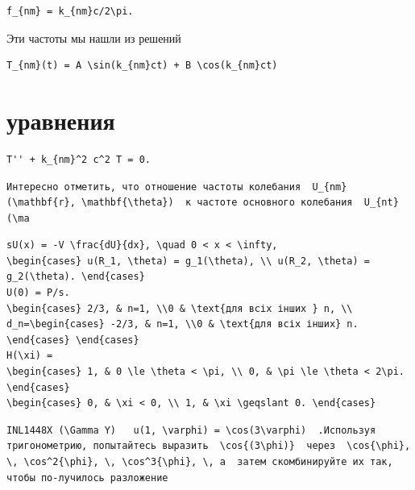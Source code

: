 \documentclass[
  ukrainian,
]{article}
\begin{document}
\begin{verbatim}
f_{nm} = k_{nm}c/2\pi.
\end{verbatim}

Эти частоты мы нашли из решений

\begin{verbatim}
T_{nm}(t) = A \sin(k_{nm}ct) + B \cos(k_{nm}ct)
\end{verbatim}

\section{уравнения}\label{ux443ux440ux430ux432ux43dux435ux43dux438ux44f}

\begin{verbatim}
T'' + k_{nm}^2 c^2 T = 0.
\end{verbatim}

\begin{verbatim}
Интересно отметить, что отношение частоты колебания  U_{nm}(\mathbf{r}, \mathbf{\theta})  к частоте основного колебания  U_{nt}(\ma
\end{verbatim}

\begin{verbatim}
sU(x) = -V \frac{dU}{dx}, \quad 0 < x < \infty,
\begin{cases} u(R_1, \theta) = g_1(\theta), \\ u(R_2, \theta) = g_2(\theta). \end{cases}
U(0) = P/s.
\begin{cases} 2/3, & n=1, \\0 & \text{для всіх інших } n, \\ d_n=\begin{cases} -2/3, & n=1, \\0 & \text{для всіх інших} n. \end{cases} \end{cases}
H(\xi) =
\begin{cases} 1, & 0 \le \theta < \pi, \\ 0, & \pi \le \theta < 2\pi. \end{cases}
\begin{cases} 0, & \xi < 0, \\ 1, & \xi \geqslant 0. \end{cases}
\end{verbatim}

\begin{verbatim}
INL1448X (\Gamma Y)   u(1, \varphi) = \cos(3\varphi)  .Используя тригонометрию, попытайтесь выразить  \cos{(3\phi)}  через  \cos{\phi}, \, \cos^2{\phi}, \, \cos^3{\phi}, \, a  затем скомбинируйте их так, чтобы по-лучилось разложение
\end{verbatim}
\end{document}
